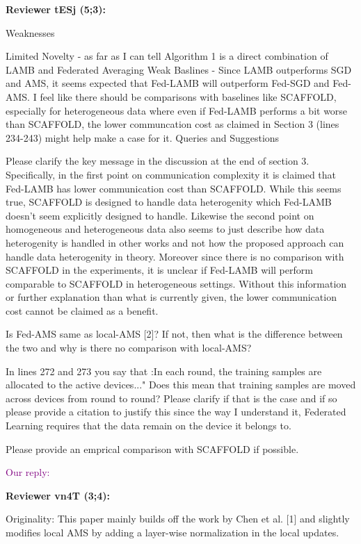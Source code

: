 \documentclass{article}
\begin{document}
\textbf{Reviewer tESj (5;3):}

Weaknesses

Limited Novelty - as far as I can tell Algorithm 1 is a direct combination of LAMB and Federated Averaging
Weak Baslines - Since LAMB outperforms SGD and AMS, it seems expected that Fed-LAMB will outperform Fed-SGD and Fed-AMS. I feel like there should be comparisons with baselines like SCAFFOLD, especially for heterogeneous data where even if Fed-LAMB performs a bit worse than SCAFFOLD, the lower communcation cost as claimed in Section 3 (lines 234-243) might help make a case for it.
Queries and Suggestions

Please clarify the key message in the discussion at the end of section 3. Specifically, in the first point on communication complexity it is claimed that Fed-LAMB has lower communication cost than SCAFFOLD. While this seems true, SCAFFOLD is designed to handle data heterogenity which Fed-LAMB doesn't seem explicitly designed to handle. Likewise the second point on homogeneous and heterogeneous data also seems to just describe how data heterogenity is handled in other works and not how the proposed approach can handle data heterogenity in theory. Moreover since there is no comparison with SCAFFOLD in the experiments, it is unclear if Fed-LAMB will perform comparable to SCAFFOLD in heterogeneous settings. Without this information or further explanation than what is currently given, the lower communication cost cannot be claimed as a benefit.

Is Fed-AMS same as local-AMS [2]? If not, then what is the difference between the two and why is there no comparison with local-AMS?

In lines 272 and 273 you say that :In each round, the training samples are allocated to the active devices..." Does this mean that training samples are moved across devices from round to round? Please clarify if that is the case and if so please provide a citation to justify this since the way I understand it, Federated Learning requires that the data remain on the device it belongs to.

Please provide an emprical comparison with SCAFFOLD if possible.


\textcolor{purple}{Our reply:}



\textbf{Reviewer vn4T (3;4):}

Originality:
This paper mainly builds off the work by Chen et al. [1] and slightly modifies local AMS by adding a layer-wise normalization in the local updates.
\end{document}
